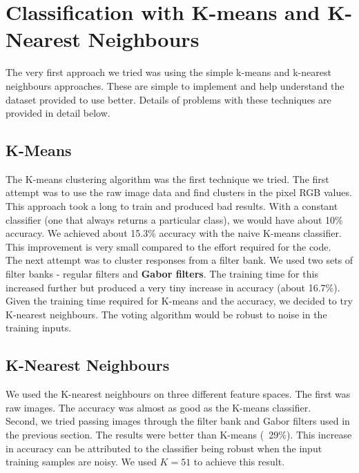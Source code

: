 \documentclass{article} %
\begin{document}
\section{Classification with K-means and K-Nearest Neighbours}
    The very first approach we tried was using the simple k-means and k-nearest neighbours approaches. These are simple to implement and help understand the dataset provided to use better. Details of problems with these techniques are provided in detail below.\\
    \subsection{K-Means} %
        The K-means clustering algorithm was the first technique we tried. The first attempt was to use the raw image data and find clusters in the pixel RGB values. This approach took a long to train and produced bad results. With a constant classifier (one that always returns a particular class), we would have about 10\% accuracy. We achieved about 15.3\% accuracy with the naive K-means classifier. This improvement is very small compared to the effort required for the code.\\

        The next attempt was to cluster responses from a filter bank. We used two sets of filter banks - regular filters and \textbf{Gabor filters}. The training time for this increased further but produced a very tiny increase in accuracy (about 16.7\%). \\

        Given the training time required for K-means and the accuracy, we decided to try K-nearest neighbours. The voting algorithm would be robust to noise in the training inputs.\\

    \subsection{K-Nearest Neighbours} %
        We used the K-nearest neighbours on three different feature spaces. The first was raw images. The accuracy was almost as good as the K-means classifier.\\
        
        Second, we tried passing images through the filter bank and Gabor filters used in the previous section. The results were better than K-means (~29\%). This increase in accuracy can be attributed to the classifier being robust when the input training samples are noisy. We used $K=51$ to achieve this result.\\
\end{document}
